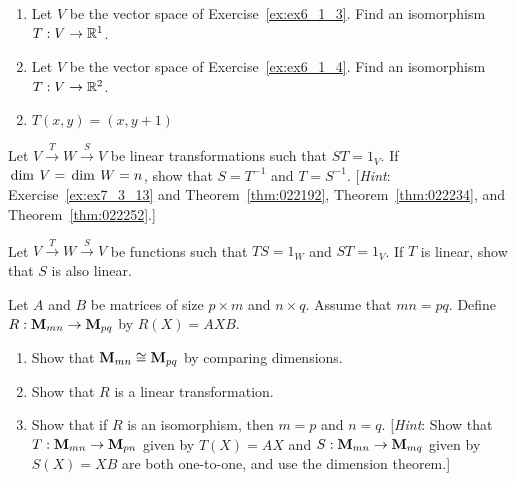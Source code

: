 \begin{multicols}{2}
\begin{ex}
\begin{enumerate}[label={\alph*.}]
\item Let $V$ be the vector space of Exercise~\ref{ex:ex6_1_3}. Find an isomorphism $T : V \to \mathbb{R}^1$.

\item Let $V$ be the vector space of Exercise~\ref{ex:ex6_1_4}. Find an isomorphism $T : V \to \mathbb{R}^2$.

\end{enumerate}
\begin{sol}
\begin{enumerate}[label={\alph*.}]
\setcounter{enumi}{1}
\item $T(x, y) = (x, y + 1)$

\end{enumerate}
\end{sol}
\end{ex}

\begin{ex}
Let $V \xrightarrow{T} W \xrightarrow{S} V$ be linear transformations such that $ST = 1_{V}$. If $\thinspace\operatorname{dim \medspace}V = \thinspace\operatorname{dim \medspace}W = n$, show that $S = T^{-1}$ and $T = S^{-1}$. [\textit{Hint}: Exercise~\ref{ex:ex7_3_13} and Theorem~\ref{thm:022192}, Theorem~\ref{thm:022234}, and Theorem~\ref{thm:022252}.]
\end{ex}

\begin{ex}
Let  $V \xrightarrow{T} W \xrightarrow{S} V$ be functions such that $TS = 1_{W}$ and $ST = 1_{V}$. If $T$ is linear, show that $S$ is also linear.
\end{ex}

\begin{ex}
Let $A$ and $B$ be matrices of size $p \times m$ and $n \times q$. Assume that $mn = pq$. Define $R : \textbf{M}_{mn} \to \textbf{M}_{pq}$ by $R(X) = AXB$.


\begin{enumerate}[label={\alph*.}]
\item Show that $\textbf{M}_{mn} \cong \textbf{M}_{pq}$ by comparing dimensions.

\item Show that $R$ is a linear transformation.

\item Show that if $R$ is an isomorphism, then $m = p$ and $n = q$. [\textit{Hint}: Show that $T : \textbf{M}_{mn} \to \textbf{M}_{pn}$ given by $T(X) = AX$ and $S : \textbf{M}_{mn} \to \textbf{M}_{mq}$ given by $S(X) = XB$ are both one-to-one, and use the dimension theorem.]


\end{enumerate}
\end{ex}
\end{multicols}
